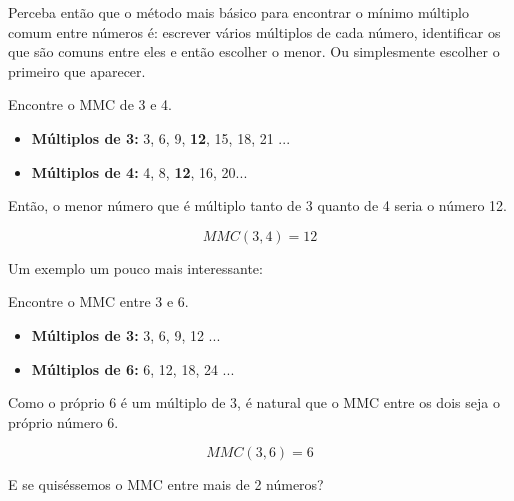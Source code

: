 Perceba então que o método mais básico para encontrar o mínimo múltiplo comum entre números é: escrever vários múltiplos de cada número, identificar os que são comuns entre eles e então escolher o menor. Ou simplesmente escolher o primeiro que aparecer.

\begin{exemplo}
    Encontre o MMC de 3 e 4.\\

    \begin{itemize}
        \item \textbf{Múltiplos de 3:} 
        3, 6, 9, \textbf{12}, 15, 18, 21 ...
        \item \textbf{Múltiplos de 4:} 
        4, 8, \textbf{12}, 16, 20...
    \end{itemize}

    Então, o menor número que é múltiplo tanto de 3 quanto de 4 seria o número 12.

    \begin{equation}
        MMC(3,4)=12
    \end{equation}
\end{exemplo}

Um exemplo um pouco mais interessante:

\begin{exemplo}
    Encontre o MMC entre 3 e 6.

    \begin{itemize}
        \item \textbf{Múltiplos de 3:} 3, 6, 9, 12 ...
        \item \textbf{Múltiplos de 6:} 6, 12, 18, 24 ...
    \end{itemize}

    Como o próprio 6 é um múltiplo de 3, é natural que o MMC entre os dois seja o próprio número 6.

    \begin{equation}
        MMC(3,6)=6
    \end{equation}
\end{exemplo}

E se quiséssemos o MMC entre mais de 2 números?

